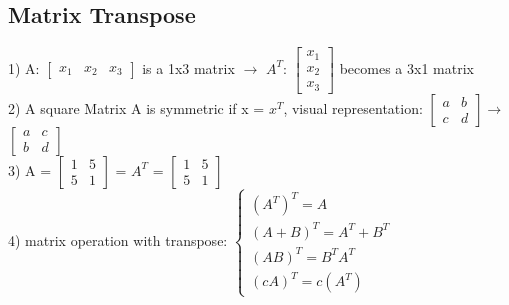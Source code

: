 \documentclass{article}
\begin{document}


\subsection{Matrix Transpose}

1) A: $\begin{bmatrix} x_1 & x_2 & x_3 \end{bmatrix}$ is a 1x3 matrix $\rightarrow$ $A^T$: $\begin{bmatrix} x_1 \\ x_2 \\ x_3 \end{bmatrix}$ becomes a 3x1 matrix \\
2) A square Matrix A is symmetric if x = $x^T$, visual representation: $\begin{bmatrix} a & b \\ c & d \end{bmatrix} \rightarrow$ $\begin{bmatrix} a & c\\ b & d \end{bmatrix}$\\
3) A = $\begin{bmatrix} 1 & 5 \\ 5 & 1 \end{bmatrix}$ = $A^T$ = $\begin{bmatrix} 1 & 5 \\ 5 & 1 \end{bmatrix}$ \\
4) matrix operation with transpose: $\begin{cases} (A^T)^T = A \\ (A+B)^T = A^T + B^T \\ (AB)^T = B^TA^T \\ (cA)^T = c(A^T) \end{cases}$
\end{document}
